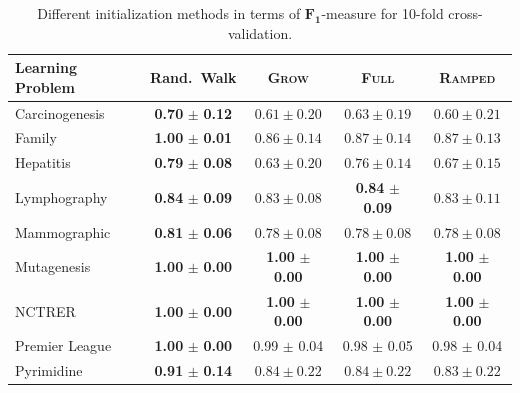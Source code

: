 \begin{table}[tbp]
    \centering
	\caption{Different initialization methods in terms of $\boldsymbol{F_1}$-measure for 10-fold cross-validation.}%
	\label{tab:init_comparison}
	\setlength{\tabcolsep}{5.9pt}
	\footnotesize
	\begin{tabular}{@{}lcccc@{}}
			\toprule
			\textbf{Learning Problem} & \textbf{Rand.\ Walk} & \textbf{\textsc{Grow}} & \textbf{\textsc{Full}} & \textbf{\textsc{Ramped}} \\
			\midrule
			Carcinogenesis & \textbf{0.70} $\boldsymbol{\pm}$ \textbf{0.12} & $0.61 \pm 0.20$ & $0.63 \pm 0.19$ & $0.60 \pm 0.21$ \\
			
			Family & \textbf{1.00} $\boldsymbol{\pm}$ \textbf{0.01} & $0.86 \pm 0.14$ & $0.87 \pm 0.14$ & $0.87 \pm 0.13$\\
			
			Hepatitis & \textbf{0.79} $\boldsymbol{\pm}$ \textbf{0.08} & $0.63 \pm 0.20$ & $0.76 \pm 0.14$ & $0.67 \pm 0.15$\\
			
			Lymphography & \textbf{0.84} $\boldsymbol{\pm}$ \textbf{0.09} & $0.83 \pm 0.08$ & \textbf{0.84} $\boldsymbol{\pm}$ \textbf{0.09} &  $0.83 \pm 0.11$\\
			
			Mammographic & \textbf{0.81} $\boldsymbol{\pm}$ \textbf{0.06} & $0.78 \pm 0.08$ & $0.78 \pm 0.08$ & $0.78 \pm 0.08$\\
			 
			Mutagenesis & \textbf{1.00} $\boldsymbol{\pm}$ \textbf{0.00} & \textbf{1.00} $\boldsymbol{\pm}$ \textbf{0.00} & \textbf{1.00} $\boldsymbol{\pm}$ \textbf{0.00} & \textbf{1.00} $\boldsymbol{\pm}$ \textbf{0.00}\\
			
			NCTRER & \textbf{1.00} $\boldsymbol{\pm}$ \textbf{0.00} & \textbf{1.00} $\boldsymbol{\pm}$ \textbf{0.00} & \textbf{1.00} $\boldsymbol{\pm}$ \textbf{0.00} & \textbf{1.00} $\boldsymbol{\pm}$ \textbf{0.00}\\
			
			Premier League & \textbf{1.00} $\boldsymbol{\pm}$ \textbf{0.00} & 0.99 $\pm$ 0.04  & 0.98 $\pm$ 0.05 & 0.98 $\pm$ 0.04 \\
			
			Pyrimidine & \textbf{0.91} $\boldsymbol{\pm}$ \textbf{0.14} & $0.84 \pm 0.22$ & $0.84 \pm 0.22$ & $0.83 \pm 0.22$\\
			\bottomrule
	\end{tabular}
\end{table}